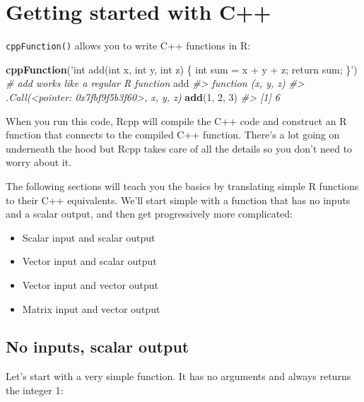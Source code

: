 \documentclass[]{book}
\makeatletter
\newenvironment{Shaded}{\begin{snugshade}}{\end{snugshade}}
\newcommand{\CommentTok}[1]{\textcolor[rgb]{0.37,0.37,0.37}{\textit{#1}}}
\newcommand{\DecValTok}[1]{\textcolor[rgb]{0.06,0.06,0.06}{#1}}
\newcommand{\KeywordTok}[1]{\textcolor[rgb]{0.27,0.27,0.27}{\textbf{#1}}}
\newcommand{\NormalTok}[1]{#1}
\newcommand{\StringTok}[1]{\textcolor[rgb]{0.5,0.5,0.5}{#1}}
\providecommand{\tightlist}{%
  \setlength{\itemsep}{0pt}\setlength{\parskip}{0pt}}
\newcommand{\indexc}[1]{\index{#1@\texttt{#1}}}
\makeatother
\begin{document}
\hypertarget{rcpp-intro}{%
\section{Getting started with C++}\label{rcpp-intro}}

\texttt{cppFunction()} allows you to write C++ functions in R: \indexc{cppFunction()}

\begin{Shaded}
\begin{Highlighting}[]
\KeywordTok{cppFunction}\NormalTok{(}\StringTok{'int add(int x, int y, int z) \{}
\StringTok{  int sum = x + y + z;}
\StringTok{  return sum;}
\StringTok{\}'}\NormalTok{)}
\CommentTok{# add works like a regular R function}
\NormalTok{add}
\CommentTok{#> function (x, y, z) }
\CommentTok{#> .Call(<pointer: 0x7fbf9f5b3f60>, x, y, z)}
\KeywordTok{add}\NormalTok{(}\DecValTok{1}\NormalTok{, }\DecValTok{2}\NormalTok{, }\DecValTok{3}\NormalTok{)}
\CommentTok{#> [1] 6}
\end{Highlighting}
\end{Shaded}

When you run this code, Rcpp will compile the C++ code and construct an R function that connects to the compiled C++ function. There's a lot going on underneath the hood but Rcpp takes care of all the details so you don't need to worry about it.

The following sections will teach you the basics by translating simple R functions to their C++ equivalents. We'll start simple with a function that has no inputs and a scalar output, and then get progressively more complicated:

\begin{itemize}
\tightlist
\item
  Scalar input and scalar output
\item
  Vector input and scalar output
\item
  Vector input and vector output
\item
  Matrix input and vector output
\end{itemize}

\hypertarget{no-inputs-scalar-output}{%
\subsection{No inputs, scalar output}\label{no-inputs-scalar-output}}

Let's start with a very simple function. It has no arguments and always returns the integer 1:
\end{document}
